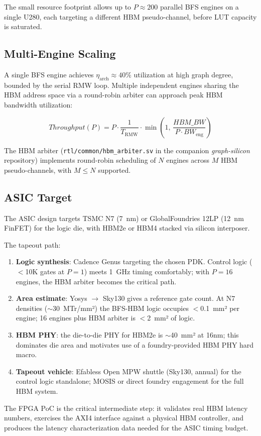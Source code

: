 The small resource footprint allows up to $P \approx 200$ parallel BFS engines
on a single U280, each targeting a different HBM pseudo-channel, before LUT
capacity is saturated.

\subsection{Multi-Engine Scaling}

A single BFS engine achieves $\eta_\text{arch} \approx 40\%$ utilization at
high graph degree, bounded by the serial RMW loop. Multiple independent engines
sharing the HBM address space via a round-robin arbiter can approach peak HBM
bandwidth utilization:

\begin{equation}
\mathit{Throughput}(P) = P \cdot \frac{1}{T_\text{RMW}} \cdot
\min\!\left(1,\, \frac{\mathit{HBM\_BW}}{P \cdot \mathit{BW}_\text{eng}}\right)
\end{equation}

The HBM arbiter (\texttt{rtl/common/hbm\_arbiter.sv} in the companion
\textit{graph-silicon} repository) implements round-robin scheduling of $N$
engines across $M$ HBM pseudo-channels, with $M \leq N$ supported.

\subsection{ASIC Target}

The ASIC design targets TSMC N7 (7~nm) or GlobalFoundries 12LP (12~nm FinFET)
for the logic die, with HBM2e or HBM4 stacked via silicon interposer.

The tapeout path:
\begin{enumerate}[leftmargin=*,itemsep=2pt]
\item \textbf{Logic synthesis}: Cadence Genus targeting the chosen PDK.
  Control logic ($<$10K gates at $P=1$) meets 1~GHz timing comfortably;
  with $P=16$ engines, the HBM arbiter becomes the critical path.
\item \textbf{Area estimate}: Yosys $\to$ Sky130 gives a reference gate count.
  At N7 densities ($\sim$30~MTr/mm²) the BFS-HBM logic occupies $<$0.1~mm²
  per engine; 16 engines plus HBM arbiter is $<$2~mm² of logic.
\item \textbf{HBM PHY}: the die-to-die PHY for HBM2e is $\sim$40~mm² at 16nm;
  this dominates die area and motivates use of a foundry-provided HBM PHY hard macro.
\item \textbf{Tapeout vehicle}: Efabless Open MPW shuttle (Sky130, annual)
  for the control logic standalone; MOSIS or direct foundry engagement for the
  full HBM system.
\end{enumerate}

The FPGA PoC is the critical intermediate step: it validates real HBM latency
numbers, exercises the AXI4 interface against a physical HBM controller, and
produces the latency characterization data needed for the ASIC timing budget.
